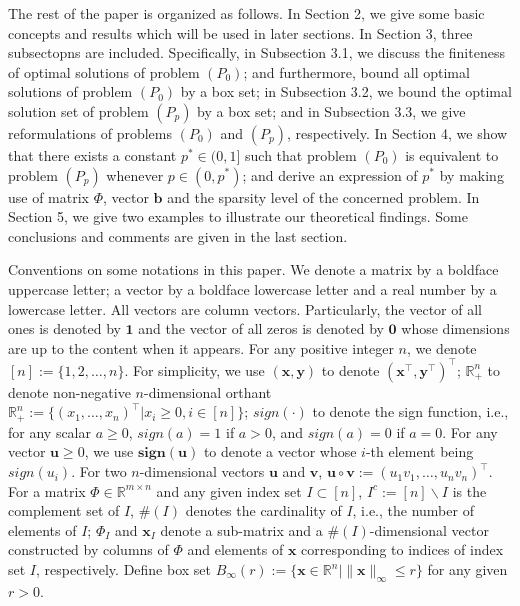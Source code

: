 \documentclass[12pt]{article}
\begin{document}
The rest of the paper is organized as follows. In Section 2, we give some basic concepts and results which will be used in later sections. In Section 3, three subsectopns are included. Specifically, in Subsection 3.1, we discuss the finiteness of optimal solutions of problem $(P_0)$; and furthermore, bound all optimal solutions of problem $(P_0)$ by a box set; in Subsection 3.2, we bound the optimal solution set of problem $(P_p)$ by a box set; and in Subsection 3.3, we give reformulations of problems $(P_0)$ and $(P_p)$, respectively. In Section 4, we show that there exists a constant $p^\ast\in (0,1]$ such that problem $(P_0)$ is equivalent to problem $(P_p)$ whenever $p\in (0,p^\ast)$; and derive an expression of $p^\ast$ by making use of matrix $\Phi$, vector $\textbf{b}$ and the sparsity level of the concerned problem. In Section 5, we give two examples to illustrate our theoretical findings. Some conclusions and comments are given in the last section.

Conventions on some notations in this paper. We denote a matrix by a boldface uppercase letter; a vector by a boldface lowercase letter and a real number by a lowercase letter. All vectors are column vectors. Particularly, the vector of all ones is denoted by $\mathbf{1}$ and the vector of all zeros is denoted by $\mathbf{0}$ whose dimensions are up to the content when it appears. For any positive integer $n$, we denote $[n]:=\{1,2,\ldots, n\}$. For simplicity, we use
$(\mathbf{x},\mathbf{y})$ to denote $(\mathbf{x}^{\top},\mathbf{y}^{\top})^{\top}$;  $\mathbb{R}^n_+$ to denote non-negative $n$-dimensional orthant $\mathbb{R}^n_+:=\{(x_1,\ldots,x_n)^{\top}|x_i\geqslant 0, i\in[n]\}$; $sign(\cdot)$ to denote the sign function, i.e., for any scalar $a\geqslant0$, $sign(a)=1$ if $a>0$, and $sign(a)=0$ if
$a=0$. For any vector $\mathbf{u}\geqslant 0$, we use $\mathbf{sign}(\mathbf{u})$ to denote a vector whose $i$-th element being $sign(u_i)$. For two $n$-dimensional vectors $\mathbf{u}$ and $\mathbf{v}$, $\mathbf{u}\circ\mathbf{v}:=(u_1v_1,\ldots,u_nv_n)^{\top}$. For a matrix $\Phi\in\mathbb{R}^{m\times n}$ and any given index set $I\subset [n]$, $I^c:=[n]\backslash I$ is the complement set of $I$, $\#(I)$ denotes the cardinality of $I$, i.e., the number of elements of $I$; $\Phi_I$ and $\mathbf{x}_I$ denote a sub-matrix and a $\#(I)$-dimensional vector constructed by columns of $\Phi$ and elements of $\mathbf{x}$ corresponding to indices of index set $I$, respectively. Define box set $B_\infty(r):=\{\mathbf{x}\in \mathbb{R}^n \mid \|\mathbf{x}\|_{\infty}\leqslant r\}$ for any given $r>0$.
\end{document}

